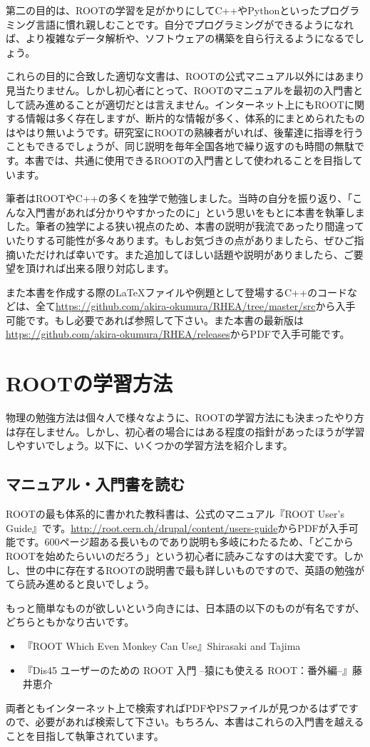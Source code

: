 第二の目的は、ROOTの学習を足がかりにしてC++やPythonといったプログラミング言語に慣れ親しむことです。自分でプログラミングができるようになれば、より複雑なデータ解析や、ソフトウェアの構築を自ら行えるようになるでしょう。

これらの目的に合致した適切な文書は、ROOTの公式マニュアル以外にはあまり見当たりません。しかし初心者にとって、ROOTのマニュアルを最初の入門書として読み進めることが適切だとは言えません。インターネット上にもROOTに関する情報は多く存在しますが、断片的な情報が多く、体系的にまとめられたものはやはり無いようです。研究室にROOTの熟練者がいれば、後輩達に指導を行うこともできるでしょうが、同じ説明を毎年全国各地で繰り返すのも時間の無駄です。本書では、共通に使用できるROOTの入門書として使われることを目指しています。

筆者はROOTやC++の多くを独学で勉強しました。当時の自分を振り返り、「こんな入門書があれば分かりやすかったのに」という思いをもとに本書を執筆しました。筆者の独学による狭い視点のため、本書の説明が我流であったり間違っていたりする可能性が多々あります。もしお気づきの点がありましたら、ぜひご指摘いただければ幸いです。また追加してほしい話題や説明がありましたら、ご要望を頂ければ出来る限り対応します。

また本書を作成する際の{\LaTeX}ファイルや例題として登場するC++のコードなどは、全て\url{https://github.com/akira-okumura/RHEA/tree/master/src}から入手可能です。もし必要であれば参照して下さい。また本書の最新版は\url{https://github.com/akira-okumura/RHEA/releases}からPDFで入手可能です。

\section{ROOTの学習方法}
物理の勉強方法は個々人で様々なように、ROOTの学習方法にも決まったやり方は存在しません。しかし、初心者の場合にはある程度の指針があったほうが学習しやすいでしょう。以下に、いくつかの学習方法を紹介します。
\subsection{マニュアル・入門書を読む}
ROOTの最も体系的に書かれた教科書は、公式のマニュアル『ROOT User's Guide』です。\url{http://root.cern.ch/drupal/content/users-guide}からPDFが入手可能です。600ページ超ある長いものであり説明も多岐にわたるため、「どこからROOTを始めたらいいのだろう」という初心者に読みこなすのは大変です。しかし、世の中に存在するROOTの説明書で最も詳しいものですので、英語の勉強がてら読み進めると良いでしょう。

もっと簡単なものが欲しいという向きには、日本語の以下のものが有名ですが、どちらともかなり古いです。
\begin{itemize}
  \item 『ROOT Which Even Monkey Can Use』Shirasaki and Tajima
  \item 『Dis45 ユーザーのための ROOT 入門 --猿にも使える ROOT：番外編--』藤井恵介
\end{itemize}
両者ともインターネット上で検索すればPDFやPSファイルが見つかるはずですので、必要があれば検索して下さい。もちろん、本書はこれらの入門書を越えることを目指して執筆されています。


